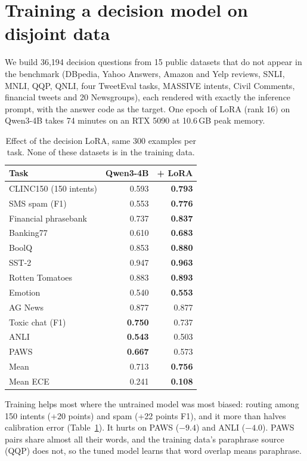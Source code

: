 \documentclass[10pt,twocolumn]{article}
\begin{document}
\section{Training a decision model on disjoint data}

We build 36{,}194 decision questions from 15 public datasets that do not appear in the benchmark (DBpedia, Yahoo
Answers, Amazon and Yelp reviews, SNLI, MNLI, QQP, QNLI, four TweetEval tasks, MASSIVE intents, Civil Comments,
financial tweets and 20 Newsgroups), each rendered with exactly the inference prompt, with the answer code as the
target. One epoch of LoRA (rank 16) on Qwen3-4B takes 74 minutes on an RTX 5090 at 10.6\,GB peak memory.

\begin{table}[t]
\centering\small
\begin{tabular}{lrr}
\toprule
Task & Qwen3-4B & + LoRA \\
\midrule
CLINC150 (150 intents) & 0.593 & \textbf{0.793} \\
SMS spam (F1) & 0.553 & \textbf{0.776} \\
Financial phrasebank & 0.737 & \textbf{0.837} \\
Banking77 & 0.610 & \textbf{0.683} \\
BoolQ & 0.853 & \textbf{0.880} \\
SST-2 & 0.947 & \textbf{0.963} \\
Rotten Tomatoes & 0.883 & \textbf{0.893} \\
Emotion & 0.540 & \textbf{0.553} \\
AG News & 0.877 & 0.877 \\
Toxic chat (F1) & \textbf{0.750} & 0.737 \\
ANLI & \textbf{0.543} & 0.503 \\
PAWS & \textbf{0.667} & 0.573 \\
\midrule
Mean & 0.713 & \textbf{0.756} \\
Mean ECE & 0.241 & \textbf{0.108} \\
\bottomrule
\end{tabular}
\caption{Effect of the decision LoRA, same 300 examples per task. None of these datasets is in the training data.}
\label{tab:lora}
\end{table}

Training helps most where the untrained model was most biased: routing among 150 intents (+20 points) and spam
(+22 points F1), and it more than halves calibration error (Table~\ref{tab:lora}). It hurts on PAWS ($-9.4$) and
ANLI ($-4.0$). PAWS pairs share almost all their words, and the training data's paraphrase source (QQP) does not,
so the tuned model learns that word overlap means paraphrase.
\end{document}
